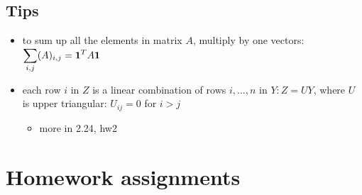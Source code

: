 \documentclass[10pt,letterpaper]{article}
\begin{document}
\subsection{Tips}
\label{sec-13_3}

\begin{itemize}
\item to sum up all the elements in matrix $A$, multiply by one vectors: $\displaystyle \sum _{i,j} (A) _{i,j} = {\bf 1} ^{T} A {\bf 1}$
\item each row $i$ in $Z$ is a linear combination of rows $i,...,n$ in $Y: Z=UY$, where $U$ is upper triangular: $U _{ij} =0$ for $i>j$

\begin{itemize}
\item more in 2.24, hw2
\end{itemize}

\end{itemize}
\section{Homework assignments}
\label{sec-14}
\end{document}
